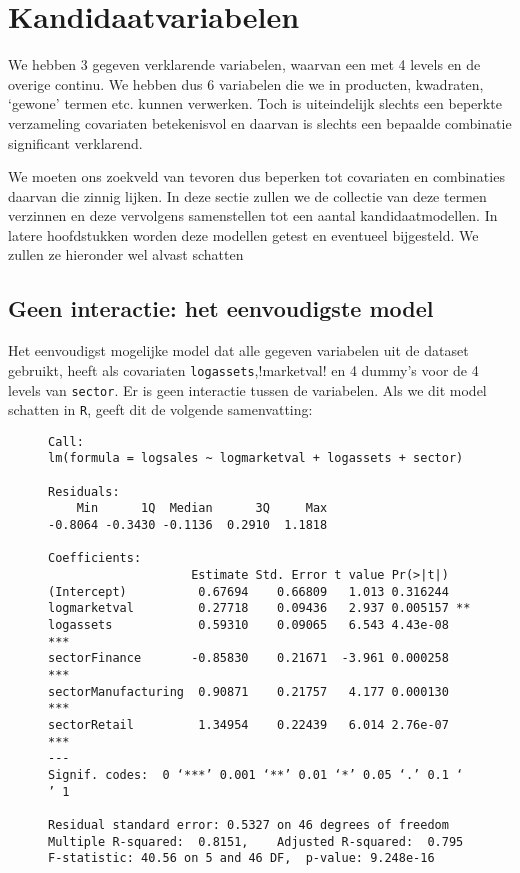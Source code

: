 \documentclass[a4paper, notitlepage]{report}
\begin{document}
\section{Kandidaatvariabelen}
  We hebben 3 gegeven verklarende variabelen, waarvan een met 4 levels en de overige continu. We hebben dus 6 variabelen die we in producten, kwadraten, `gewone' termen etc. kunnen verwerken. Toch is uiteindelijk slechts een beperkte verzameling covariaten betekenisvol en daarvan is slechts een bepaalde combinatie significant verklarend. 
 
  We moeten ons zoekveld van tevoren dus beperken tot covariaten en combinaties daarvan die zinnig lijken. In deze sectie zullen we de collectie van deze termen verzinnen en deze vervolgens samenstellen tot een aantal kandidaatmodellen. In latere hoofdstukken worden deze modellen getest en eventueel bijgesteld. We zullen ze hieronder wel alvast schatten
  
\subsection{Geen interactie: het eenvoudigste model}
  Het eenvoudigst mogelijke model dat alle gegeven variabelen uit de dataset gebruikt, heeft als covariaten \verb!logassets!,\log!marketval! en 4 dummy's voor de 4 levels van \verb!sector!. Er is geen interactie tussen de variabelen. Als we dit model schatten in \verb!R!, geeft dit de volgende samenvatting:
  \begin{figure}
  \begin{verbatim}
Call:
lm(formula = logsales ~ logmarketval + logassets + sector)

Residuals:
    Min      1Q  Median      3Q     Max 
-0.8064 -0.3430 -0.1136  0.2910  1.1818 

Coefficients:
                    Estimate Std. Error t value Pr(>|t|)    
(Intercept)          0.67694    0.66809   1.013 0.316244    
logmarketval         0.27718    0.09436   2.937 0.005157 ** 
logassets            0.59310    0.09065   6.543 4.43e-08 ***
sectorFinance       -0.85830    0.21671  -3.961 0.000258 ***
sectorManufacturing  0.90871    0.21757   4.177 0.000130 ***
sectorRetail         1.34954    0.22439   6.014 2.76e-07 ***
---
Signif. codes:  0 ‘***’ 0.001 ‘**’ 0.01 ‘*’ 0.05 ‘.’ 0.1 ‘ ’ 1

Residual standard error: 0.5327 on 46 degrees of freedom
Multiple R-squared:  0.8151,	Adjusted R-squared:  0.795 
F-statistic: 40.56 on 5 and 46 DF,  p-value: 9.248e-16
  \end{verbatim}
  \end{figure}
  
\end{document}
